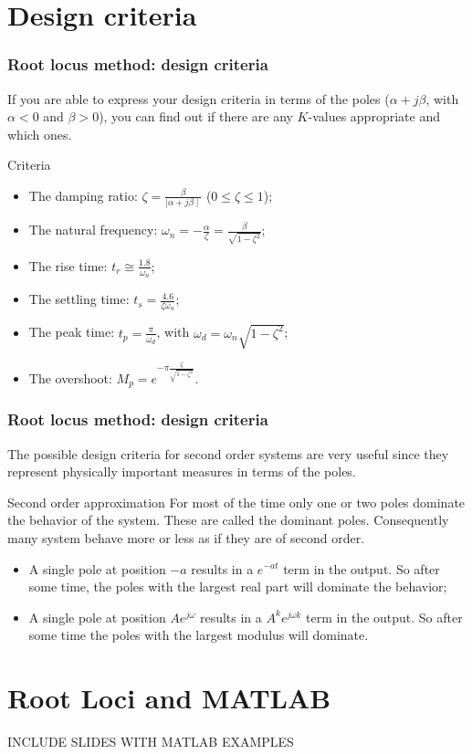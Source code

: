 \section{Design criteria}

\begin{frame}
\frametitle{Root locus method: design criteria}
	If you are able to express your design criteria in terms of the poles ($\alpha + j\beta$, with $\alpha < 0$ and $\beta>0$), you can find out if there are any $K$-values appropriate and which ones.\\
	\begin{block}{Criteria}
	\begin{itemize}
		\item The damping ratio: $\zeta = \frac{\beta}{\mid \alpha + j\beta\mid}$ ($0 \leq \zeta \leq 1$);
		\item The natural frequency: $\omega_n = -\frac{\alpha}{\zeta} = \frac{\beta}{\sqrt{1 - \zeta^2}}$;
		\item The rise time: $t_r \cong \frac{1.8}{\omega_n}$;
		\item The settling time: $t_s = \frac{4.6}{\zeta \omega_n}$;
		\item The peak time: $t_p =\frac{\pi}{\omega_d}$, with $\omega_d = \omega_n \sqrt{1 - \zeta^2} $;
		\item The overshoot: $M_p = e^{-\pi \frac{\zeta}{\sqrt{1 - \zeta^2}}}$.
	\end{itemize}
	\end{block}
\end{frame}

\begin{frame}
\frametitle{Root locus method: design criteria}
	The possible design criteria for second order systems are very useful since they represent physically important measures in terms of the poles.\\
	\begin{alertblock}{Second order approximation}
		For most of the time only one or two poles dominate the behavior of the system. These are called the dominant poles. Consequently many system behave more or less as if they are of second order.
	\end{alertblock}
	\begin{itemize}
		\item A single pole at position $-a$ results in a $e^{-at}$ term in the output. So after some time, the poles with the largest real part will dominate the behavior;
		\item A single pole at position $Ae^{j\omega}$ results in a $A^ke^{j\omega k}$ term in the output. So after some time the poles with the largest modulus will dominate. 
	\end{itemize}
\end{frame}
	
\section{Root Loci and MATLAB}

\begin{frame}
	INCLUDE SLIDES WITH MATLAB EXAMPLES
\end{frame}